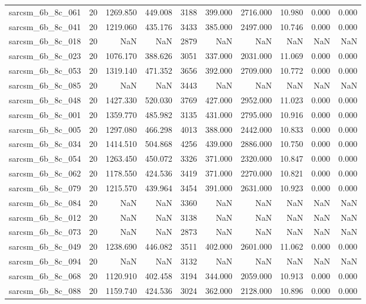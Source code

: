 \begin{tabular}{lrrrrrrrrr}
sarcsm\_6b\_8c\_061 & 20 & 1269.850 & 449.008 & 3188 & 399.000 & 2716.000 & 10.980 & 0.000 & 0.000 \\
sarcsm\_6b\_8c\_041 & 20 & 1219.060 & 435.176 & 3433 & 385.000 & 2497.000 & 10.746 & 0.000 & 0.000 \\
sarcsm\_6b\_8c\_018 & 20 & NaN & NaN & 2879 & NaN & NaN & NaN & NaN & NaN \\
sarcsm\_6b\_8c\_023 & 20 & 1076.170 & 388.626 & 3051 & 337.000 & 2031.000 & 11.069 & 0.000 & 0.000 \\
sarcsm\_6b\_8c\_053 & 20 & 1319.140 & 471.352 & 3656 & 392.000 & 2709.000 & 10.772 & 0.000 & 0.000 \\
sarcsm\_6b\_8c\_085 & 20 & NaN & NaN & 3443 & NaN & NaN & NaN & NaN & NaN \\
sarcsm\_6b\_8c\_048 & 20 & 1427.330 & 520.030 & 3769 & 427.000 & 2952.000 & 11.023 & 0.000 & 0.000 \\
sarcsm\_6b\_8c\_001 & 20 & 1359.770 & 485.982 & 3135 & 431.000 & 2795.000 & 10.916 & 0.000 & 0.000 \\
sarcsm\_6b\_8c\_005 & 20 & 1297.080 & 466.298 & 4013 & 388.000 & 2442.000 & 10.833 & 0.000 & 0.000 \\
sarcsm\_6b\_8c\_034 & 20 & 1414.510 & 504.868 & 4256 & 439.000 & 2886.000 & 10.750 & 0.000 & 0.000 \\
sarcsm\_6b\_8c\_054 & 20 & 1263.450 & 450.072 & 3326 & 371.000 & 2320.000 & 10.847 & 0.000 & 0.000 \\
sarcsm\_6b\_8c\_062 & 20 & 1178.550 & 424.536 & 3419 & 371.000 & 2270.000 & 10.821 & 0.000 & 0.000 \\
sarcsm\_6b\_8c\_079 & 20 & 1215.570 & 439.964 & 3454 & 391.000 & 2631.000 & 10.923 & 0.000 & 0.000 \\
sarcsm\_6b\_8c\_084 & 20 & NaN & NaN & 3360 & NaN & NaN & NaN & NaN & NaN \\
sarcsm\_6b\_8c\_012 & 20 & NaN & NaN & 3138 & NaN & NaN & NaN & NaN & NaN \\
sarcsm\_6b\_8c\_073 & 20 & NaN & NaN & 2873 & NaN & NaN & NaN & NaN & NaN \\
sarcsm\_6b\_8c\_049 & 20 & 1238.690 & 446.082 & 3511 & 402.000 & 2601.000 & 11.062 & 0.000 & 0.000 \\
sarcsm\_6b\_8c\_094 & 20 & NaN & NaN & 3132 & NaN & NaN & NaN & NaN & NaN \\
sarcsm\_6b\_8c\_068 & 20 & 1120.910 & 402.458 & 3194 & 344.000 & 2059.000 & 10.913 & 0.000 & 0.000 \\
sarcsm\_6b\_8c\_088 & 20 & 1159.740 & 424.536 & 3024 & 362.000 & 2128.000 & 10.896 & 0.000 & 0.000 \\

\end{tabular}
